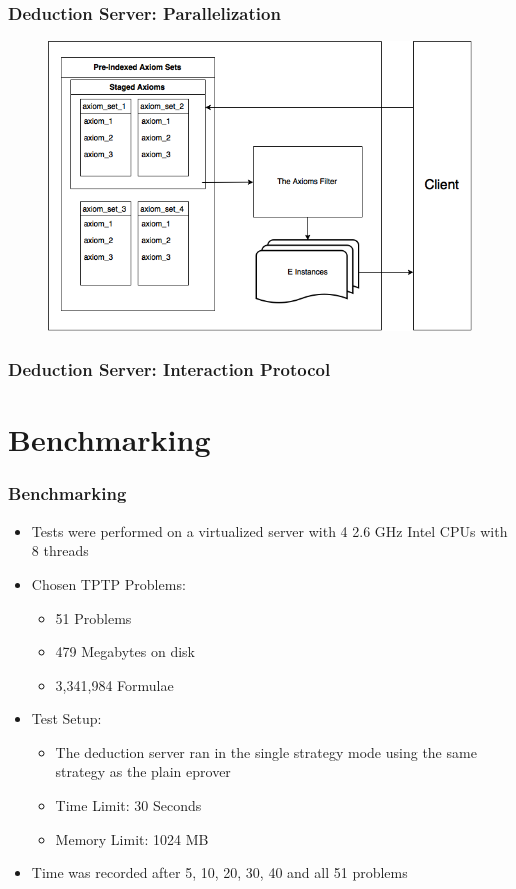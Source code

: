 \documentclass[10pt]{beamer}
\begin{document}
\begin{frame}[fragile]
  \frametitle{Deduction Server: Parallelization}
    \begin{figure} \includegraphics[width=\linewidth,height=\textheight,keepaspectratio]{imgs/TheDeductionServer.png} \end{figure}
\end{frame}

\begin{frame}[fragile]
  \frametitle{Deduction Server: Interaction Protocol}
\end{frame}

\section{Benchmarking}
\begin{frame}[fragile]
  \frametitle{Benchmarking}
  \begin{itemize}[<+- | alert@+>]
    \item Tests were performed on a virtualized server with 4 2.6 GHz Intel CPUs with 8 threads
    \item Chosen TPTP Problems:
      \begin{itemize}
        \item 51 Problems
        \item 479 Megabytes on disk
        \item 3,341,984 Formulae
      \end{itemize}
    \item Test Setup:
      \begin{itemize}
        \item The deduction server ran in the single strategy mode using the same strategy as the plain eprover
        \item Time Limit: 30 Seconds
        \item Memory Limit: 1024 MB
      \end{itemize}
    \item Time was recorded after 5, 10, 20, 30, 40 and all 51 problems
  \end{itemize}
\end{frame}
\end{document}
